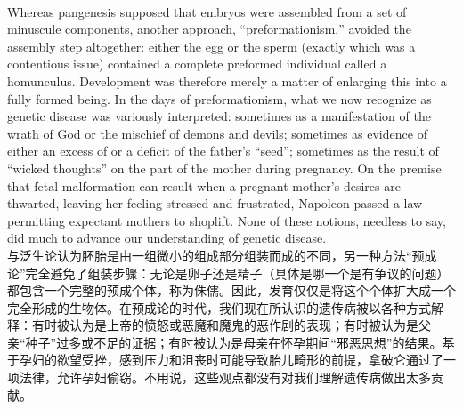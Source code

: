 \documentclass{article}
\begin{document}
\\
Whereas pangenesis supposed that embryos were assembled from a set of minuscule components, another approach, “preformationism,” avoided the assembly step altogether: either the egg or the sperm (exactly which was a contentious issue) contained a complete preformed individual called a homunculus. Development was therefore merely a matter of enlarging this into a fully formed being. In the days of preformationism, what we now recognize as genetic disease was variously interpreted: sometimes as a manifestation of the wrath of God or the mischief of demons and devils; sometimes as evidence of either an excess of or a deficit of the father’s “seed”; sometimes as the result of “wicked thoughts” on the part of the mother during pregnancy. On the premise that fetal malformation can result when a pregnant mother’s desires are thwarted, leaving her feeling stressed and frustrated, Napoleon passed a law permitting expectant mothers to shoplift. None of these notions, needless to say, did much to advance our understanding of genetic disease.\\
与泛生论认为胚胎是由一组微小的组成部分组装而成的不同，另一种方法“预成论”完全避免了组装步骤：无论是卵子还是精子（具体是哪一个是有争议的问题）都包含一个完整的预成个体，称为侏儒。因此，发育仅仅是将这个个体扩大成一个完全形成的生物体。在预成论的时代，我们现在所认识的遗传病被以各种方式解释：有时被认为是上帝的愤怒或恶魔和魔鬼的恶作剧的表现；有时被认为是父亲“种子”过多或不足的证据；有时被认为是母亲在怀孕期间“邪恶思想”的结果。基于孕妇的欲望受挫，感到压力和沮丧时可能导致胎儿畸形的前提，拿破仑通过了一项法律，允许孕妇偷窃。不用说，这些观点都没有对我们理解遗传病做出太多贡献。\\
\end{document}
